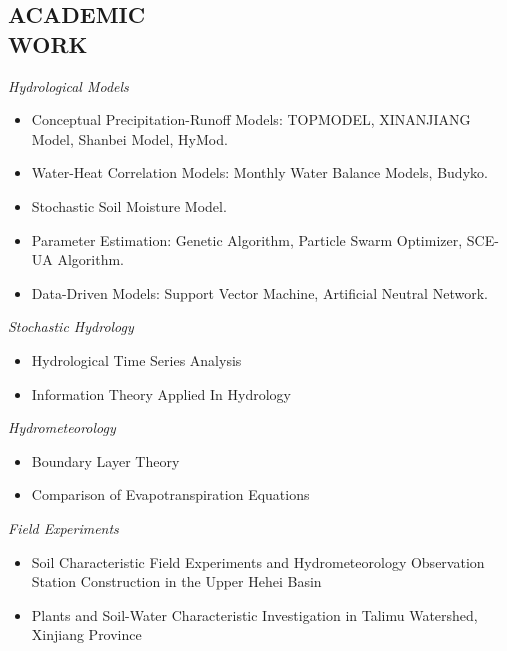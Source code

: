 \documentclass[margin]{res}
\begin{document}
\begin{resume}
\section{ACADEMIC\\WORK} {\sl Hydrological Models}   \\
                 \begin{itemize}  \itemsep -2pt %
                 \item Conceptual Precipitation-Runoff Models: TOPMODEL, XINANJIANG Model, Shanbei Model, HyMod.
                \item  Water-Heat Correlation Models: Monthly Water Balance Models, Budyko.
                \item Stochastic Soil Moisture Model.
                \item  Parameter Estimation: Genetic Algorithm, Particle Swarm Optimizer, SCE-UA Algorithm. 
                \item Data-Driven Models: Support Vector Machine, Artificial Neutral Network.
                \end{itemize}
 
                {\sl Stochastic Hydrology}  \\
                 \begin{itemize}  \itemsep -2pt %
                 \item Hydrological Time Series Analysis
                 \item Information Theory Applied In Hydrology
                 
                 \end{itemize} 
                 {\sl Hydrometeorology}  \\
                 \begin{itemize}  \itemsep -2pt %
                 \item Boundary Layer Theory
                 \item Comparison of Evapotranspiration Equations 
                 
                 \end{itemize} 
                 {\sl Field Experiments}  \\
                 \begin{itemize}  \itemsep -2pt %
                 \item Soil Characteristic Field Experiments and Hydrometeorology Observation Station Construction in the Upper Hehei Basin  
                 \item Plants and Soil-Water Characteristic Investigation in Talimu Watershed, Xinjiang Province 
                 

\end{itemize}
\end{resume}
\end{document}
